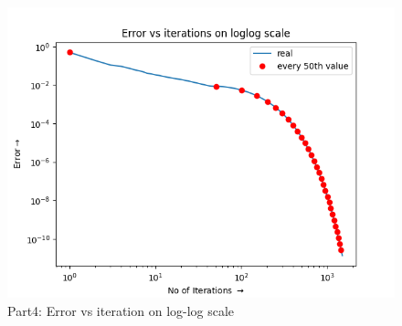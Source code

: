 \documentclass[12pt, a4paper]{report}
\begin{document}
  \begin{figure}[H]
	\centering
	\includegraphics[scale=0.8]{Figure_4.png} 
	\caption{Part4: Error vs iteration on log-log scale}
	\label{fig:4}
  \end{figure}
  
\end{document}
